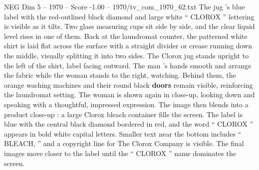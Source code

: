 \begin{textsample}{NEG Dim 5 – 1970 – Score -1.00 – 1970/tv\_com\_1970\_62.txt}
The jug ’s blue label with the red-outlined black diamond and large white “ CLOROX ” lettering is visible as it tilts.
Two glass measuring cups sit side by side, and the clear liquid level rises in one of them.
Back at the laundromat counter, the patterned white shirt is laid flat across the surface with a straight divider or crease running down the middle, visually splitting it into two sides.
The Clorox jug stands upright to the left of the shirt, label facing outward.
The man ’s hands smooth and arrange the fabric while the woman stands to the right, watching.
Behind them, the orange washing machines and their round black \textbf{doors} remain visible, reinforcing the laundromat setting.
The woman is shown again in close-up, looking down and speaking with a thoughtful, impressed expression.
The image then blends into a product close-up : a large Clorox bleach container fills the screen.
The label is blue with the central black diamond bordered in red, and the word “ CLOROX ” appears in bold white capital letters.
Smaller text near the bottom includes “ BLEACH, ” and a copyright line for The Clorox Company is visible.
The final images move closer to the label until the “ CLOROX ” name dominates the screen.

\end{textsample}

